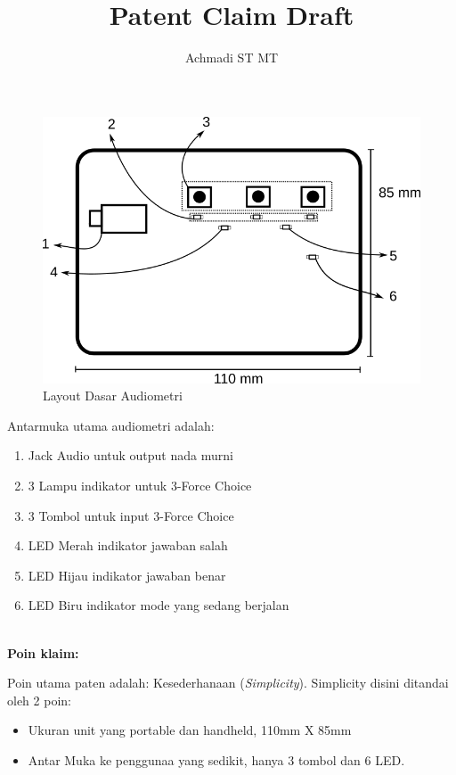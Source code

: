 \documentclass[12pt,]{article}
\title{\Large \bf
	Patent Claim Draft\\
}
\author{Achmadi ST MT}
\date{}
\begin{document}
	\thispagestyle{empty}
	
	\begin{figure}[!ht]
		\centering
		\includegraphics[width=400pt]{part}
		\caption{Layout Dasar Audiometri}
	\end{figure}

	Antarmuka utama audiometri adalah:
	\begin{enumerate}
		\item Jack Audio untuk output nada murni
		\item 3 Lampu indikator untuk 3-Force Choice
		\item 3 Tombol untuk input 3-Force Choice
		\item LED Merah indikator jawaban salah
		\item LED Hijau indikator jawaban benar
		\item LED Biru indikator mode yang sedang berjalan
	\end{enumerate}

	\noindent\makebox[\linewidth]{\rule{\paperwidth}{0.4pt}}\\

	\textbf{Poin klaim:}

	Poin utama paten adalah: Kesederhanaan (\textit{Simplicity}). 
	Simplicity disini ditandai oleh 2 poin:

	\begin{itemize}
		\item Ukuran unit yang portable dan handheld, 110mm X 85mm
		\item Antar Muka ke penggunaa yang sedikit, hanya 3 tombol dan 6 LED.			
	\end{itemize}
\end{document}
